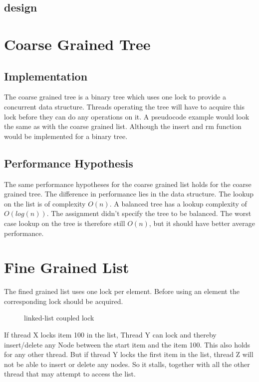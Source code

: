 \documentclass[10pt,a4paper]{article}
\begin{document}
\subsection{design}


\section{Coarse Grained Tree} \subsection{Implementation} The coarse grained
tree is a binary tree which uses one lock to provide a concurrent data
structure. Threads operating the tree will have to acquire this lock before
they can do any operations on it. A pseudocode example would look the same as
with the coarse grained list. Although the insert and rm function would be
implemented for a binary tree.

\subsection{Performance Hypothesis} The same performance hypotheses for the
coarse grained list holds for the coarse grained tree. The difference in
performance lies in the data structure. The lookup on the list is of complexity
$O(n)$. A balanced tree has a lookup complexity of $O(log(n))$. The assignment
didn't specify the tree to be balanced. The worst case lookup on the tree is
therefore still $O(n)$, but it should have better average performance.

\section{Fine Grained List} The fined grained list uses one lock per element.
Before using an element the corresponding lock should be acquired.

\begin{figure}[h] \centerline{ } \caption{linked-list coupled lock} \end{figure}

If thread X locks item 100 in the list, Thread Y can lock and thereby
insert/delete any Node between the start item and the item 100. This also holds
for any other thread. But if thread Y locks the first item in the list, thread
Z will not be able to insert or delete any nodes. So it stalls, together with
all the other thread that may attempt to access the list.
\end{document}
